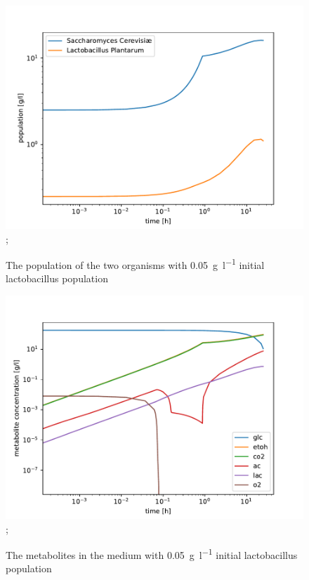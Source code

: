 		\begin{figure}[h]
			\includegraphics[width=\linewidth]{figures/results/cocultures/0_1_populations.pdf};
			\caption{The population of the two organisms with \SI{0.05}{\gram\per\litre} initial lactobacillus population}
			\label{fig:cocult_0.1_pop}
		\end{figure}
		
		\begin{figure}[h]
			\includegraphics[width=\linewidth]{figures/results/cocultures/0_1_metabolites.pdf};
			\caption{The metabolites in the medium with \SI{0.05}{\gram\per\litre} initial lactobacillus population}
			\label{fig:cocult_0.1_met}
		\end{figure}
		
